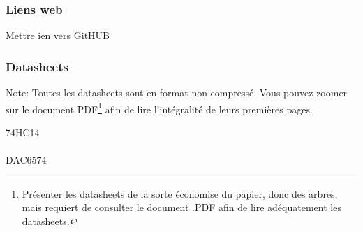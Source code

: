 \documentclass[10pt,a4paper,final]{article}
\begin{document}
\begin{spacing}{1.5}
\subsubsection{Liens web}
Mettre ien vers GitHUB
\pagebreak
\subsubsection{Datasheets}
Note: Toutes les datasheets sont en format non-compressé. Vous pouvez zoomer sur le document PDF\footnote{Présenter les datasheets de la sorte économise du papier, donc des arbres, mais requiert de consulter le document .PDF afin de lire adéquatement les datasheets.} afin de lire l'intégralité de leurs premières pages.
\begin{multicols}{3}
74HC14\\
\\
DAC6574\\

\end{multicols}
\end{spacing}
\end{document}
